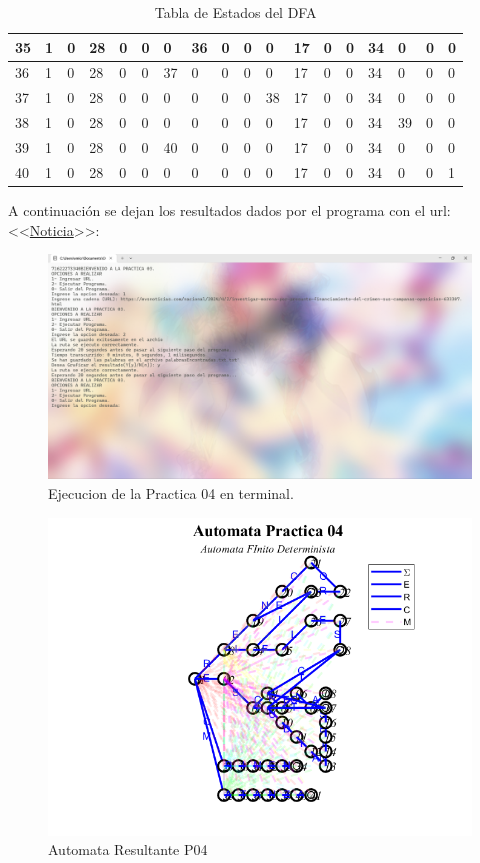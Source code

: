 \documentclass{article}
\begin{document}
\begin{table}[!htbp]
\begin{adjustbox}{max width=\textwidth}
\begin{tabular}{|l|l|l|l|l|l|l|l|l|l|l|l|l|l|l|l|l|l|}
            35 & 1 & 0 & 28 & 0 & 0 & 0 & 36 & 0 & 0 & 0 & 17 & 0 & 0 & 34 & 0 & 0 & 0 \\ \hline
            36 & 1 & 0 & 28 & 0 & 0 & 37 & 0 & 0 & 0 & 0 & 17 & 0 & 0 & 34 & 0 & 0 & 0 \\ \hline
            37 & 1 & 0 & 28 & 0 & 0 & 0 & 0 & 0 & 0 & 38 & 17 & 0 & 0 & 34 & 0 & 0 & 0 \\ \hline
            38 & 1 & 0 & 28 & 0 & 0 & 0 & 0 & 0 & 0 & 0 & 17 & 0 & 0 & 34 & 39 & 0 & 0 \\ \hline
            39 & 1 & 0 & 28 & 0 & 0 & 40 & 0 & 0 & 0 & 0 & 17 & 0 & 0 & 34 & 0 & 0 & 0 \\ \hline
            40 & 1 & 0 & 28 & 0 & 0 & 0 & 0 & 0 & 0 & 0 & 17 & 0 & 0 & 34 & 0 & 0 & 1 \\ \hline
        \end{tabular}
        \end{adjustbox}
        \caption{Tabla de Estados del DFA}
    \end{table}
    \newpage
    A continuación se dejan los resultados dados por el programa con el url:
    <<\href{https://mvsnoticias.com/nacional/2024/4/2/investigar-morena-por-presunto-financiamiento-del-crimen-sus-campanas-oposicion-633307.html}{Noticia}>>:

    \begin{figure}[H]
        \centering
        \includegraphics[width=0.75\linewidth]{TerminalP04.png}
        \caption{Ejecucion de la Practica 04 en terminal.}\label{terminalP04}
    \end{figure}

    \begin{figure}[H]
        \centering
        \includegraphics[width=0.6\linewidth]{automataP04.png}
        \caption{Automata Resultante P04}\label{automataP04}
    \end{figure}
\end{document}
